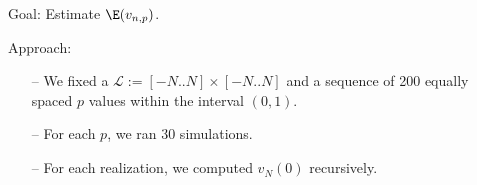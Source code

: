 \documentclass[11pt, mathserif]{beamer}
\begin{document}
    \begin{frame}
        \textcolor{blendedblue}{Goal}: Estimate $\E(v_{n, p})$.
        \vspace{0.3cm}

        Approach: 
        \begin{itemize}
            \item[--] We fixed a $\mathcal{L} := [-N..N] \times [-N..N]$ and a sequence of 200 equally spaced $p$ values within the interval $(0, 1)$. 
            \item[--] For each $p$, we ran 30 simulations.
            \item[--] For each realization, we computed $v_N(0)$ recursively.  
        \end{itemize}

        
    \end{frame}





\end{document}
